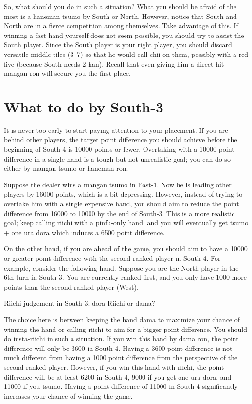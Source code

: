 \bigskip
So, what should you do in such a situation?
What you should be afraid of the most is a {\jap haneman tsumo} by South or North. However, notice that South and North are in a fierce competition among themselves. Take advantage of this. If winning a fast hand yourself does not seem possible, you should try to assist the South player. Since the South player is your right player, you should discard versatile middle tiles (3--7) so that he would call {\jap chii} on them, possibly with a red five (because South needs 2 {\jap han}). Recall that even giving him a direct hit {\jap mangan ron} will secure you the first place.

\section{What to do by South-3}
It is never too early to start paying attention to your placement. If you are behind other players, the target point difference you should achieve before the beginning of South-4 is 10000 points or fewer. Overtaking with a 10000 point difference in a single hand is a tough but not unrealistic goal; you can do so either by {\jap mangan tsumo} or {\jap haneman ron}.

\bigskip
Suppose the dealer wins a {\jap mangan tsumo} in East-1. Now he is leading other players by 16000 points, which is a bit depressing. However, instead of trying to overtake him with a single expensive hand, you should aim to reduce the point difference from 16000 to 10000 by the end of South-3. This is a more realistic goal; keep calling riichi with a {\jap pinfu}-only hand, and you will eventually get {\jap tsumo} + one {\jap ura dora} which induces a 6500 point difference.

\bigskip
On the other hand, if you are ahead of the game, you should aim to have a 10000 or greater point difference with the second ranked player in South-4.
For example, consider the following hand. Suppose you are the North player in the 6th turn in South-3. You are currently ranked first, and you only have 1000 more points than the second ranked player (West).

\bigskip
\begin{itembox}[r]{{\jap Riichi} judgement in South-3: {\jap dora} {\LARGE{}}}
\bp
{}\bei
\ep
\vspace{-10pt}
{\jap Riichi} or {\jap dama}?
\end{itembox}
\noindent The choice here is between keeping the hand {\jap dama} to maximize your chance of winning the hand or calling riichi to aim for a bigger point difference.
You should do insta-riichi in such a situation. If you win this hand by {\jap dama ron}, the point difference will only be 3600 in South-4. Having a 3600 point difference is not much different from having a 1000 point difference from the perspective of the second ranked player. However, if you win this hand with riichi, the point difference will be at least 6200 in South-4, 9000 if you get one {\jap ura dora}, and 11000 if you {\jap tsumo}. Having a point difference of 11000 in South-4 significantly increases your chance of winning the game.

